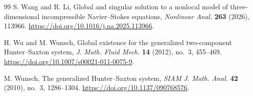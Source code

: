 \documentclass[11pt]{article}
\theoremstyle{definition}
\begin{document}
\begin{thebibliography}{99}
S. Wang and R. Li,
Global and singular solution to a nonlocal model of three-dimensional incompressible Navier--Stokes equations,
\emph{Nonlinear Anal.} \textbf{263} (2026), 113966.
\url{https://doi.org/10.1016/j.na.2025.113966}.

H. Wu and M. Wunsch,
Global existence for the generalized two-component Hunter--Saxton system,
\emph{J. Math. Fluid Mech.} \textbf{14} (2012), no.~3, 455--469.
\url{https://doi.org/10.1007/s00021-011-0075-9}.


M. Wunsch,
The generalized Hunter--Saxton system,
\emph{SIAM J. Math. Anal.} \textbf{42} (2010), no.~3, 1286--1304.
\url{https://doi.org/10.1137/090768576}.

\end{thebibliography}
\end{document}
